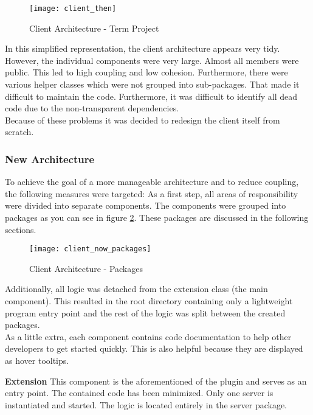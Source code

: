 \begin{figure}[H]
    \centering
    \texttt{[image: client\_then]}
    \caption{Client Architecture - Term Project}
    \label{fig:client_then}
\end{figure}

In this simplified representation, the client architecture appears very tidy.
However, the individual components were very large.
Almost all members were public. This led to high coupling and low cohesion.
Furthermore, there were various helper classes which were not grouped into sub-packages.
That made it difficult to maintain the code. Furthermore,
it was difficult to identify all dead code due to the non-transparent dependencies. \\

Because of these problems it was decided to redesign the client itself from scratch.

\subsubsection{New Architecture}
To achieve the goal of a more manageable architecture and to reduce coupling, the following measures were targeted:
As a first step, all areas of responsibility were divided into separate components.
The components were grouped into packages as you can see in figure \ref{fig:client_now_packages}.
These packages are discussed in the following sections. \\

\begin{figure}[H]
    \centering
    \texttt{[image: client\_now\_packages]}
    \caption{Client Architecture - Packages}
    \label{fig:client_now_packages}
\end{figure}

Additionally, all logic was detached from the extension class (the main component).
This resulted in the root directory containing only a lightweight program entry point
and the rest of the logic was split between the created packages. \\

As a little extra, each component contains code documentation to help other developers to get started quickly. This is also helpful because they are displayed as hover tooltips.


{\bf Extension} \textendash{}
This component is the aforementioned  of the plugin and serves as an entry point. The contained code has been minimized. Only one server is instantiated and started. The logic is located entirely in the server package. \\

